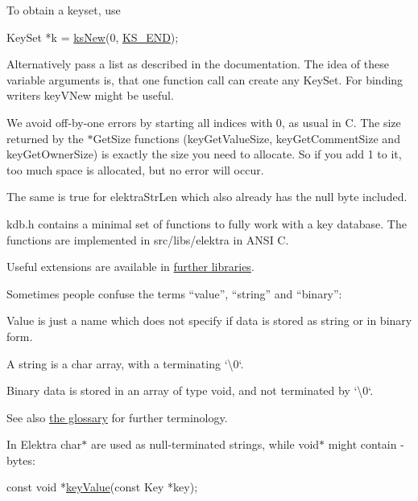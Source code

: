 To obtain a {\ttfamily keyset}, use


\begin{DoxyCode}
KeySet *k = \hyperlink{group__keyset_ga671e1aaee3ae9dc13b4834a4ddbd2c3c}{ksNew}(0, \hyperlink{group__keyset_ga7a28fce3773b2c873c94ac80b8b4cd54}{KS\_END});
\end{DoxyCode}


Alternatively pass a list as described in the documentation. The idea of these variable arguments is, that one function call can create any {\ttfamily Key\+Set}. For binding writers {\ttfamily key\+V\+New} might be useful.

We avoid off-\/by-\/one errors by starting all indices with 0, as usual in C. The size returned by the {\ttfamily $\ast$\+Get\+Size} functions ({\ttfamily key\+Get\+Value\+Size}, {\ttfamily key\+Get\+Comment\+Size} and {\ttfamily key\+Get\+Owner\+Size}) is exactly the size you need to allocate. So if you add 1 to it, too much space is allocated, but no error will occur.

The same is true for {\ttfamily elektra\+Str\+Len} which also already has the null byte included.

{\ttfamily kdb.\+h} contains a minimal set of functions to fully work with a key database. The functions are implemented in {\ttfamily src/libs/elektra} in A\+N\+SI C.

Useful extensions are available in \hyperlink{src_libs_README_md}{further libraries}.

Sometimes people confuse the terms “value”, “string” and “binary”\+:


\begin{DoxyItemize}
\item Value is just a name which does not specify if data is stored as string or in binary form.
\item A string is a char array, with a terminating `\textquotesingle{}\textbackslash{}0\textquotesingle{}`.
\item Binary data is stored in an array of type void, and not terminated by `\textquotesingle{}\textbackslash{}0\textquotesingle{}`.
\end{DoxyItemize}

See also \hyperlink{doc_help_elektra-glossary_md}{the glossary} for further terminology.

In Elektra {\ttfamily char$\ast$} are used as null-\/terminated strings, while {\ttfamily void$\ast$} might contain {}-\/bytes\+:


\begin{DoxyCode}
\textcolor{keyword}{const} \textcolor{keywordtype}{void} *\hyperlink{group__keyvalue_ga6f29609c5da53c6dc26a98678d5752af}{keyValue}(\textcolor{keyword}{const} Key *key);
\end{DoxyCode}


